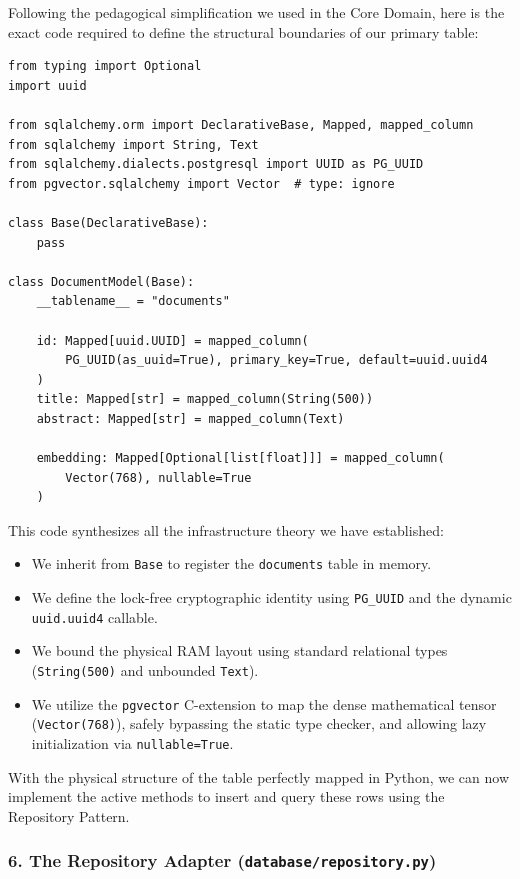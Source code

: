 Following the pedagogical simplification we used in the Core Domain, here is the exact code required to define the structural boundaries of our primary table:

\begin{lstlisting}[caption={The Concrete SQLAlchemy Adapter (\texttt{models.py})}]
from typing import Optional
import uuid

from sqlalchemy.orm import DeclarativeBase, Mapped, mapped_column
from sqlalchemy import String, Text
from sqlalchemy.dialects.postgresql import UUID as PG_UUID
from pgvector.sqlalchemy import Vector  # type: ignore

class Base(DeclarativeBase):
    pass

class DocumentModel(Base):
    __tablename__ = "documents"

    id: Mapped[uuid.UUID] = mapped_column(
        PG_UUID(as_uuid=True), primary_key=True, default=uuid.uuid4
    )
    title: Mapped[str] = mapped_column(String(500))
    abstract: Mapped[str] = mapped_column(Text)

    embedding: Mapped[Optional[list[float]]] = mapped_column(
        Vector(768), nullable=True
    )
\end{lstlisting}

This code synthesizes all the infrastructure theory we have established:
\begin{itemize}
    \item We inherit from \texttt{Base} to register the \texttt{documents} table in memory.
    \item We define the lock-free cryptographic identity using \texttt{PG\_UUID} and the dynamic \texttt{uuid.uuid4} callable.
    \item We bound the physical RAM layout using standard relational types (\texttt{String(500)} and unbounded \texttt{Text}).
    \item We utilize the \texttt{pgvector} C-extension to map the dense mathematical tensor (\texttt{Vector(768)}), safely bypassing the static type checker, and allowing lazy initialization via \texttt{nullable=True}.
\end{itemize}

With the physical structure of the table perfectly mapped in Python, we can now implement the active methods to insert and query these rows using the Repository Pattern.







\subsubsection*{6. The Repository Adapter (\texttt{database/repository.py})}


